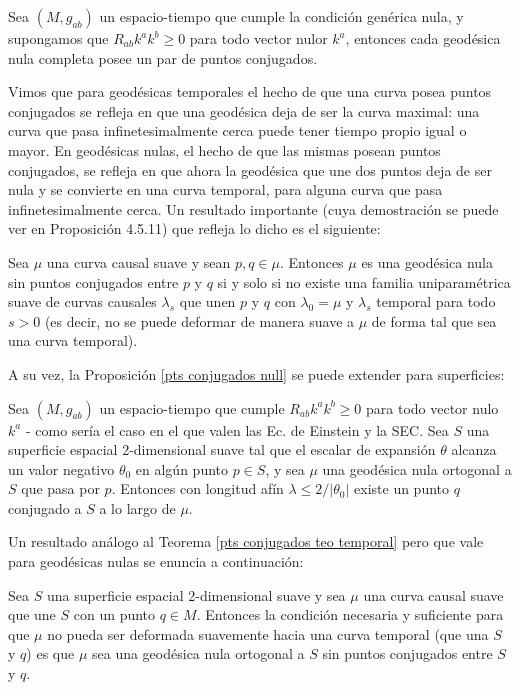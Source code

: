 \begin{proposition}
Sea $(M,g_{ab})$ un espacio-tiempo que cumple la condición genérica nula, y supongamos que $R_{ab}k^ak^b\geq0$ para todo vector nulor $k^a$, entonces cada geodésica nula completa posee un par de puntos conjugados.
\end{proposition}


Vimos que para geodésicas temporales el hecho de que una curva posea puntos conjugados se refleja en que una geodésica deja de ser la curva maximal: una curva que pasa infinetesimalmente cerca puede tener tiempo propio igual o mayor. En geodésicas nulas, el hecho de que las mismas posean puntos conjugados, se refleja en que ahora la geodésica que une dos puntos deja de ser nula y se convierte en una curva temporal, para alguna curva que pasa infinetesimalmente cerca. Un resultado importante (cuya demostración se puede ver en \citep{1975lsss.book.....H} Proposición 4.5.11) que refleja lo dicho es el siguiente:

\begin{theorem}
Sea $\mu$ una curva causal suave y sean $p,q\in \mu$. Entonces $\mu$ es una geodésica nula sin puntos conjugados entre $p$ y $q$ si y solo si no existe una familia uniparamétrica suave de curvas causales $\lambda_s$ que unen $p$ y $q$ con $\lambda_0=\mu$ y $\lambda_s$ temporal para todo $s>0$ (es decir, no se puede deformar de manera suave a $\mu$ de forma tal que sea una curva temporal). 
\end{theorem}



A su vez, la Proposición \ref{pts conjugados null} se puede extender para superficies:

\begin{proposition}\label{Prop 9.3.9 Wald}
Sea $(M,g_{ab})$ un espacio-tiempo que cumple $R_{ab}k^ak^b\geq0$ para todo vector nulo $k^a$ - como sería el caso en el que valen las Ec. de Einstein y la SEC. Sea $S$ una superficie espacial 2-dimensional suave tal que el escalar de expansión $\theta$ alcanza un valor negativo $\theta_0$ en algún punto $p\in S$, y sea $\mu$ una geodésica nula ortogonal a $S$ que pasa por $p$. Entonces con longitud afín $\lambda\leq2/|\theta_0|$ existe un punto $q$ conjugado a $S$ a lo largo de $\mu$.
\end{proposition}


Un resultado análogo al Teorema \ref{pts conjugados teo temporal} pero que vale para geodésicas nulas se enuncia a continuación:

\begin{theorem}
Sea $S$ una superficie espacial 2-dimensional suave y sea $\mu$ una curva causal suave que une $S$ con un punto $q\in M$. Entonces la condición necesaria y suficiente para que $\mu$ no pueda ser deformada suavemente hacia una curva temporal (que una $S$ y $q$) es que $\mu$ sea una geodésica nula ortogonal a $S$ sin puntos conjugados entre $S$ y $q$.
\end{theorem}

